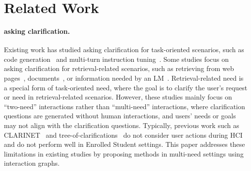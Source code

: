 \section{Related Work}

\label{sec:related_work}
\paragraph{asking clarification.}

Existing work has studied asking clarification for task-oriented scenarios, such as code generation~\citep{clarifygpt, treewalker, benchmark_code_generate} and multi-turn instruction tuning~\citep{proactive_cot, rethink_rephrase}. Some studies focus on asking clarification for retrieval-related scenarios, such as retrieving from web pages~\citep{clarinet}, documents~\citep{multiturn_clarification}, or information needed by an LM~\citep{inscit, star_gate, learn_to_clarify}. Retrieval-related need is a special form of task-oriented need, where the goal is to clarify the user's request or need in retrieval-related scenarios. However, these studies mainly focus on ``two-need'' interactions rather than ``multi-need'' interactions, where clarification questions are generated without human interactions, and users' needs or goals may not align with the clarification questions. Typically, previous work such as CLARINET~\citep{clarinet} and tree-of-clarifications~\citep{tree_of_clarifications} do not consider user actions during HCI and do not perform well in Enrolled Student settings. This paper addresses these limitations in existing studies by proposing methods in multi-need settings using interaction graphs.
